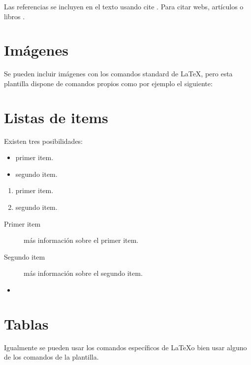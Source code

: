Las referencias se incluyen en el texto usando cite \cite{wiki:latex}. Para citar webs, artículos o libros \cite{koza92}.


\section{Imágenes}

Se pueden incluir imágenes con los comandos standard de \LaTeX, pero esta plantilla dispone de comandos propios como por ejemplo el siguiente:




\section{Listas de items}

Existen tres posibilidades:

\begin{itemize}
	\item primer item.
	\item segundo item.
\end{itemize}

\begin{enumerate}
	\item primer item.
	\item segundo item.
\end{enumerate}

\begin{description}
	\item[Primer item] más información sobre el primer item.
	\item[Segundo item] más información sobre el segundo item.
\end{description}
	
\begin{itemize}
\item 
\end{itemize}

\section{Tablas}

Igualmente se pueden usar los comandos específicos de \LaTeX o bien usar alguno de los comandos de la plantilla.

